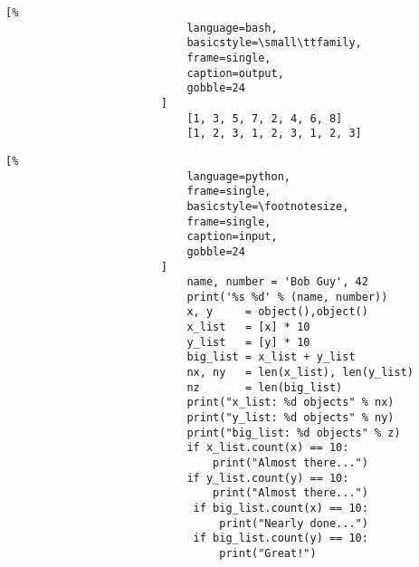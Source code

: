 \documentclass[crop=false,class=book,oneside]{standalone}
\begin{document}
                    \begin{minipage}[t]{.48\textwidth}
                        \centering
                        \begin{lstlisting}[%
                            language=bash,
                            basicstyle=\small\ttfamily,
                            frame=single,
                            caption=output,
                            gobble=24
                        ]
                            [1, 3, 5, 7, 2, 4, 6, 8]
                            [1, 2, 3, 1, 2, 3, 1, 2, 3]
                        \end{lstlisting}
                    \end{minipage}
                    \begin{minipage}[t]{.48\textwidth}
                        \centering
                        \begin{lstlisting}[%
                            language=python,
                            frame=single,
                            basicstyle=\footnotesize,
                            frame=single,
                            caption=input,
                            gobble=24
                        ]
                            name, number = 'Bob Guy', 42
                            print('%s %d' % (name, number))
                            x, y     = object(),object()
                            x_list   = [x] * 10
                            y_list   = [y] * 10
                            big_list = x_list + y_list
                            nx, ny   = len(x_list), len(y_list)
                            nz       = len(big_list)
                            print("x_list: %d objects" % nx)
                            print("y_list: %d objects" % ny)
                            print("big_list: %d objects" % z)
                            if x_list.count(x) == 10:
                                print("Almost there...")
                            if y_list.count(y) == 10:
                                print("Almost there...")
                             if big_list.count(x) == 10:
                                 print("Nearly done...")
                             if big_list.count(y) == 10:
                                 print("Great!")
                        \end{lstlisting}
                    \end{minipage}\hfill
\end{document}
